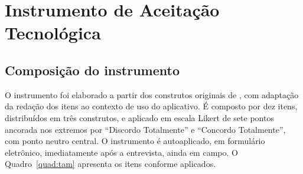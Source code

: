\section{Instrumento de Aceitação Tecnológica}
\label{sec:instrumento_tam}

\subsection{Composição do instrumento}

O instrumento foi elaborado a partir dos construtos originais de
, com adaptação da redação dos itens ao contexto de uso do
aplicativo. É composto por dez itens, distribuídos em três construtos, e aplicado
em escala Likert de sete pontos ancorada nos extremos por ``Discordo Totalmente''
e ``Concordo Totalmente'', com ponto neutro central. O instrumento é
autoaplicado, em formulário eletrônico, imediatamente após a entrevista, ainda em
campo. O Quadro~\ref{quad:tam} apresenta os itens conforme aplicados.

